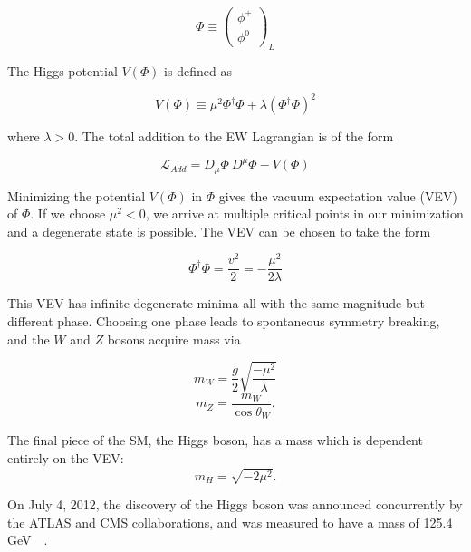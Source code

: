 \begin{equation}
\Phi \equiv \begin{pmatrix}\phi^{+} \\ \phi^{0}\end{pmatrix}_{L}
\end{equation}

\noindent The Higgs potential $V(\Phi)$ is defined as

\begin{equation}
V(\Phi) \equiv \mu^{2}\Phi^{\dagger}\Phi + \lambda\left(\Phi^{\dagger}\Phi\right)^{2}
\end{equation}

\noindent where $\lambda > 0$. The total addition to the EW Lagrangian is of the form

\begin{equation}
\mathcal{L}_{Add} = D_{\mu}\Phi\ D^{\mu}\Phi - V(\Phi)
\end{equation}

Minimizing the potential $V(\Phi)$ in $\Phi$ gives the vacuum expectation value (VEV) of $\Phi$. If we choose $\mu^{2} < 0$, we arrive at multiple critical points in our minimization and a degenerate state is possible. The VEV can be chosen to take the form\cite{srednicki}

\begin{equation}
\Phi^\dagger\Phi = \frac{v^2}{2} = -\frac{\mu^2}{2\lambda}
\end{equation}

This VEV has infinite degenerate minima all with the same magnitude but different phase. Choosing one phase leads to spontaneous symmetry breaking, and the $W$ and $Z$ bosons acquire mass via\cite{halzen}

\begin{equation}
m_{W} = \frac{g}{2}\sqrt{\frac{-\mu^{2}}{\lambda}}
\end{equation}
\begin{equation}
m_{Z} = \frac{m_{W}}{\cos{\theta_W}}.
\end{equation}

The final piece of the SM, the Higgs boson, has a mass which is dependent entirely on the VEV:
\begin{equation}
m_H = \sqrt{-2\mu^2}.
\end{equation}

On July 4, 2012, the discovery of the Higgs boson was announced concurrently by the ATLAS and CMS collaborations, and was measured to have a mass of 125.4 GeV~\cite{CMSHiggs}~\cite{ATLASHiggs}.

